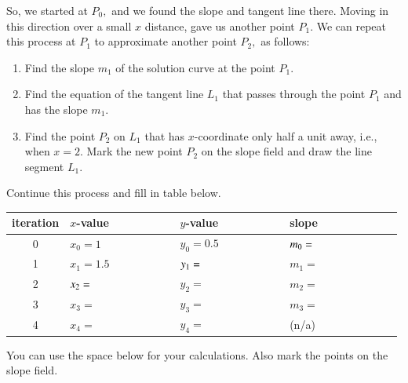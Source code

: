 \documentclass[12pt]{amsart}
\numberwithin{equation}{section}
\begin{document}
	\noindent So, we started at	$P_0,$ and we found the slope and tangent line there. Moving in this direction over a small $x$ distance, gave us another point $P_1$. We can repeat this process at $P_1$ to	approximate another point $P_2,$ as follows:

		\begin{enumerate}
			\item  Find the slope $m_1$ of the solution curve at the point $P_1.$\\ \vspace{0.5in}
			\item  Find the equation of the tangent line $L_1$ that passes through
					the point $P_1$ and has the slope $m_1.$\\ \vspace{0.5in}
			\item  Find the point $P_2$ on $L_1$ that has $x$-coordinate only half a unit away, 
				i.e., when $x = 2.$  Mark the new point $P_2$ on the slope field and draw the line segment $L_1.$ \\ \vspace{0.29in}
		\end{enumerate}

		Continue this process and fill in table below.  
			\begin{center}
				\begin{tabular}{|c|l|l|l|}
					\hline
					iteration	& $x$-value	& $y$-value	& slope	\\
					\hline
					\hline
					0		& $x_0 = 1$	& $y_0 = 0.5$	& $m_0 = \hspace{2.5cm}$\mbox{}\\
					\hline
					1		& $x_1 = 1.5$	& $y_1 = \hspace{2.5cm}$\mbox{}& $m_1 = $\\
					\hline
					2		& $x_2 = \hspace{2.5cm}$\mbox{} & $y_2 = $	& $m_2 = $\\
					\hline
					3		& $x_3 = $	& $y_3 = $	& $m_3 = $\\
					\hline
					4		& $x_4 = $	& $y_4 = $	& (n/a)\\
					\hline
				\end{tabular}
			\end{center}
			
			You can use the space below for your calculations.  Also mark the points on the slope field.
			\vfill

	\newpage
\end{document}
